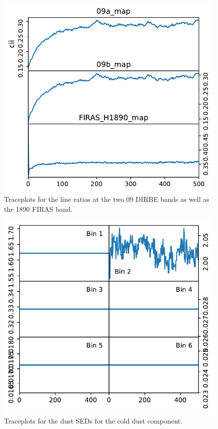 \documentclass{aa}
\begin{document}
\begin{figure}
    \centering
    \includegraphics[width=\columnwidth]{figures/traceplots_cii_lineratios.pdf}
    \caption{Traceplots for the line ratios at the two 09 DIRBE bands as well as the 1890 FIRAS band.}
    \label{fig:traceplots_cii_lineratios}
\end{figure}

\begin{figure}
    \centering
    \includegraphics[width=\columnwidth]{"figures/traceplots_dust_seds_cold_dust.pdf"}
    \caption{Traceplots for the dust SEDs for the cold dust component.}
    \label{fig:traceplots_dust_seds_colddust}
\end{figure}
\end{document}
